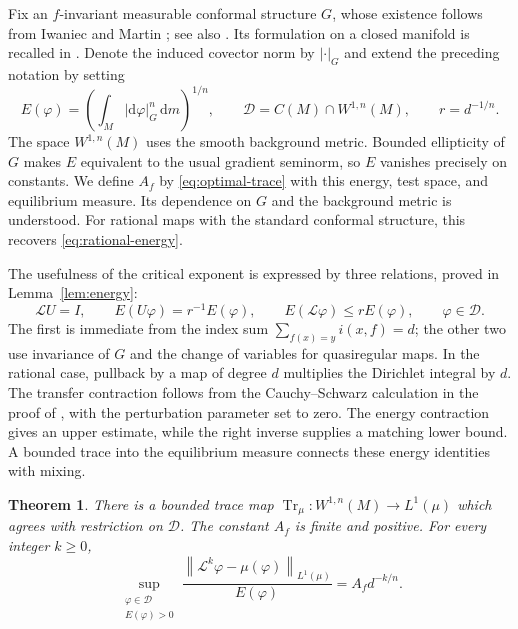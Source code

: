 \documentclass[10pt,a4paper]{amsart}
\newtheorem{theorem}{Theorem}[section]
\newcommand{\E}{\mathbb E}
\newcommand{\Lop}{\mathcal L}
\newcommand{\Dcal}{\mathcal D}
\newcommand{\Tr}{\operatorname{Tr}_{\mu}}
\newcommand{\norm}[1]{\left\lVert #1\right\rVert}
\newcommand{\dd}{\mathrm d}
\numberwithin{equation}{section}
\begin{document}
Fix an $f$-invariant measurable conformal structure $G$, whose existence follows from Iwaniec and Martin \cite[Theorem 5.1]{IM96}; see also \cite[Section 21.5]{IM01}. Its formulation on a closed manifold is recalled in \cite[Section 4]{OP14}. Denote the induced covector norm by $|\cdot|_G$ and extend the preceding notation by setting
\begin{equation}\label{eq:energy-intro}
 E(\varphi)=\left(\int_M|\dd\varphi|_G^n\,\dd m\right)^{1/n},
 \qquad \Dcal=C(M)\cap W^{1,n}(M),
 \qquad r=d^{-1/n}.
\end{equation}
The space $W^{1,n}(M)$ uses the smooth background metric. Bounded ellipticity of $G$ makes $E$ equivalent to the usual gradient seminorm, so $E$ vanishes precisely on constants. We define $A_f$ by \eqref{eq:optimal-trace} with this energy, test space, and equilibrium measure. Its dependence on $G$ and the background metric is understood. For rational maps with the standard conformal structure, this recovers \eqref{eq:rational-energy}.

The usefulness of the critical exponent is expressed by three relations, proved in Lemma~\ref{lem:energy}:
\begin{equation}\label{eq:intro-operator-mechanism}
 \Lop U=I,\qquad E(U\varphi)=r^{-1}E(\varphi),\qquad
 E(\Lop\varphi)\le rE(\varphi),\qquad\varphi\in\Dcal.
\end{equation}
The first is immediate from the index sum $\sum_{f(x)=y}i(x,f)=d$; the other two use invariance of $G$ and the change of variables for quasiregular maps. In the rational case, pullback by a map of degree $d$ multiplies the Dirichlet integral by $d$. The transfer contraction follows from the Cauchy--Schwarz calculation in the proof of \cite[Proposition 4.2]{DNS07}, with the perturbation parameter set to zero.
The energy contraction gives an upper estimate, while the right inverse supplies a matching lower bound. A bounded trace into the equilibrium measure connects these energy identities with mixing.

\begin{theorem}\label{thm:main}
There is a bounded trace map $\Tr\colon W^{1,n}(M)\to L^1(\mu)$ which agrees with restriction on $\Dcal$. The constant $A_f$ is finite and positive. For every integer $k\ge0$,
\begin{equation}\label{eq:sharp-mixing}
 \sup_{\substack{\varphi\in\Dcal\\E(\varphi)>0}}
 \frac{\norm{\Lop^k\varphi-\mu(\varphi)}_{L^1(\mu)}}{E(\varphi)}
 =A_f d^{-k/n}.
\end{equation}
\end{theorem}
\end{document}
